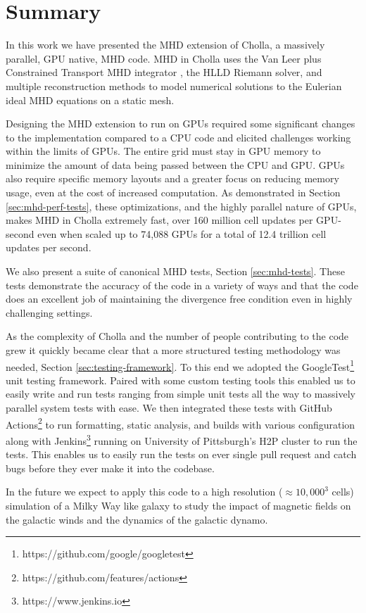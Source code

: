 \section{Summary}
\label{sec:summary}

In this work we have presented the MHD extension of Cholla, a massively parallel, GPU native, MHD code. MHD in Cholla uses the Van Leer plus Constrained Transport MHD integrator \citep{stone_2009}, the HLLD Riemann solver, and multiple reconstruction methods to model numerical solutions to the Eulerian ideal MHD equations on a static mesh.

Designing the MHD extension to run on GPUs required some significant changes to the implementation compared to a CPU code and elicited challenges working within the limits of GPUs. The entire grid must stay in GPU memory to minimize the amount of data being passed between the CPU and GPU. GPUs also require specific memory layouts and a greater focus on reducing memory usage, even at the cost of increased computation. As demonstrated in Section \ref{sec:mhd-perf-tests}, these optimizations, and the highly parallel nature of GPUs, makes MHD in Cholla extremely fast, over 160 million cell updates per GPU-second even when scaled up to 74,088 GPUs for a total of  12.4 trillion cell updates per second. 

We also present a suite of canonical MHD tests, Section \ref{sec:mhd-tests}. These tests demonstrate the accuracy of the code in a variety of ways and that the code does an excellent job of maintaining the divergence free condition even in highly challenging settings. 

As the complexity of Cholla and the number of people contributing to the code grew it quickly became clear that a more structured testing methodology was needed, Section \ref{sec:testing-framework}. To this end we adopted the GoogleTest\footnote{https://github.com/google/googletest} unit testing framework. Paired with some custom testing tools this enabled us to easily write and run tests ranging from simple unit tests all the way to massively parallel system tests with ease. We then integrated these tests with GitHub Actions\footnote{https://github.com/features/actions} to run formatting, static analysis, and builds with various configuration along with Jenkins\footnote{https://www.jenkins.io} running on University of Pittsburgh's H2P cluster to run the tests. This enables us to easily run the tests on ever single pull request and catch bugs before they ever make it into the codebase.

In the future we expect to apply this code to a high resolution ($\approx 10,000^3$ cells) simulation of a Milky Way like galaxy to study the impact of magnetic fields on the galactic winds and the dynamics of the galactic dynamo.